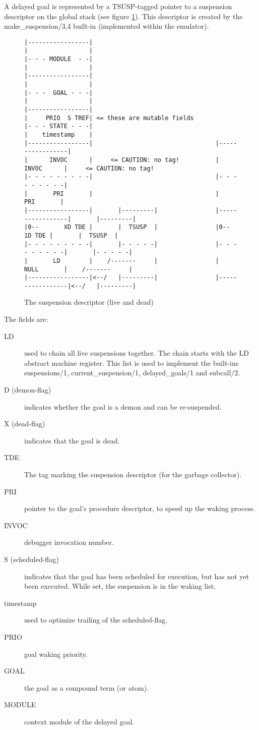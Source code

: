 A delayed goal is represented by a TSUSP-tagged pointer
to a suspension descriptor on the global stack (see figure \ref{figsuspension}).
This descriptor is created by the make_suspension/3,4
built-in (implemented within the emulator).
\begin{figure}
\hfill
\begin{minipage}[t]{.9\textwidth}
\begin{tiny}
\begin{verbatim}
|-----------------|
|                 |
|- - - MODULE  - -|
|                 |
|-----------------|
|                 |
|- - -  GOAL - - -|
|                 |
|-----------------|
|     PRIO  S TREF| <= these are mutable fields
|- - - STATE - - -|
|    timestamp    |
|-----------------|                                  |-----------------|
|      INVOC      |     <= CAUTION: no tag!          |      INVOC      |     <= CAUTION: no tag!
|- - - - - - - - -|                                  |- - - - - - - - -|
|       PRI       |                                  |       PRI       |
|-----------------|       |---------|                |-----------------|       |---------|
|0--       XD TDE |       |  TSUSP  |                |0--       1D TDE |       |  TSUSP  |
|- - - - - - - - -|       |- - - - -|                |- - - - - - - - -|       |- - - - -|
|       LD        |    /-------     |                |      NULL       |    /-------     |
|-----------------|<--/   |---------|                |-----------------|<--/   |---------|
\end{verbatim}
\end{tiny}
\end{minipage}
\hfill
\caption{The suspension descriptor (live and dead)}
\label{figsuspension}
\end{figure}
The fields are:
\begin{description}
\item[LD] used to chain all live suspensions together. The chain starts
with the LD abstract machine register. This list is used to implement the
built-ins suspensions/1, current_suspension/1, delayed_goals/1 and subcall/2.
\item[D (demon-flag)] indicates whether the goal is a demon and can be
re-suspended.
\item[X (dead-flag)] indicates that the goal is dead.
\item[TDE] The tag marking the suspension descriptor (for the garbage collector).
\item[PRI] pointer to the goal's procedure descriptor, to speed up the
waking process.
\item[INVOC] debugger invocation number.
\item[S (scheduled-flag)] indicates that the goal has been scheduled for
execution, but has not yet been executed. While set, the suspension is in the
waking list.
\item[timestamp] used to optimize trailing of the scheduled-flag.
\item[PRIO] goal waking priority.
\item[GOAL] the goal as a compound term (or atom).
\item[MODULE] context module of the delayed goal.
\end{description}
